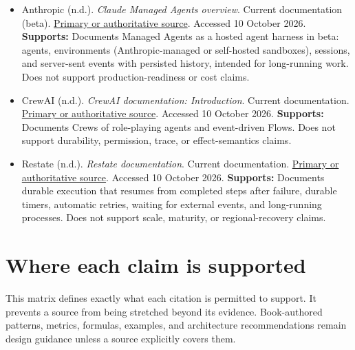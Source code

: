 \begin{itemize}
\item {}\textbf{} Anthropic (n.d.). \emph{Claude Managed Agents overview}. Current documentation (beta). \href{\detokenize{https://platform.claude.com/docs/en/managed-agents/overview}}{Primary or authoritative source}. Accessed 10 October 2026. \textbf{Supports:} Documents Managed Agents as a hosted agent harness in beta: agents, environments (Anthropic-managed or self-hosted sandboxes), sessions, and server-sent events with persisted history, intended for long-running work. Does not support production-readiness or cost claims.

\item {}\textbf{} CrewAI (n.d.). \emph{CrewAI documentation: Introduction}. Current documentation. \href{\detokenize{https://docs.crewai.com/en/introduction}}{Primary or authoritative source}. Accessed 10 October 2026. \textbf{Supports:} Documents Crews of role-playing agents and event-driven Flows. Does not support durability, permission, trace, or effect-semantics claims.

\item {}\textbf{} Restate (n.d.). \emph{Restate documentation}. Current documentation. \href{\detokenize{https://docs.restate.dev/}}{Primary or authoritative source}. Accessed 10 October 2026. \textbf{Supports:} Documents durable execution that resumes from completed steps after failure, durable timers, automatic retries, waiting for external events, and long-running processes. Does not support scale, maturity, or regional-recovery claims.

\end{itemize}

\section{Where each claim is supported}

This matrix defines exactly what each citation is permitted to support. It prevents a source from being stretched beyond its evidence. Book-authored patterns, metrics, formulas, examples, and architecture recommendations remain design guidance unless a source explicitly covers them.\par

